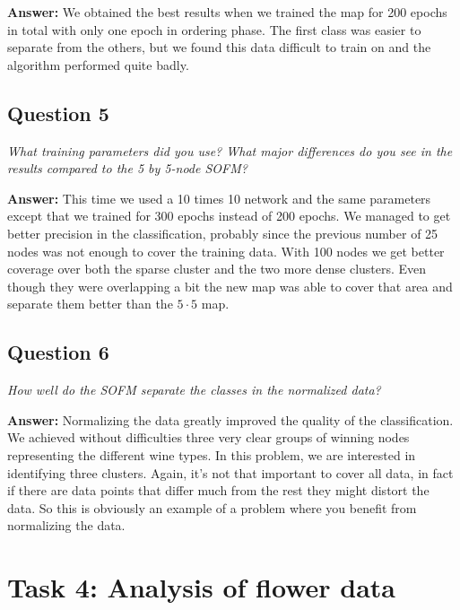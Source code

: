 \documentclass[a4paper]{article}
\begin{document}
\textbf{Answer:} We obtained the best results when we trained the map for 200 epochs in total with only one epoch in ordering phase. The first class was easier to separate from the others, but we found this data difficult to train on and the algorithm performed quite badly.

\subsection*{Question 5}
\emph{What training parameters did you use? What  major differences
do you see in the results compared to the 5 by 5-node SOFM?}

\textbf{Answer:} This time we used a 10 times 10 network and the same parameters except that we trained for 300 epochs instead of 200 epochs. We managed to get better precision in the classification, probably since the previous number of 25 nodes was not enough to cover the training data. With 100 nodes we get better coverage over both the sparse cluster and the two more dense clusters. Even though they were overlapping a bit the new map was able to cover that area and separate them better than the $5\cdot5$ map. 


\subsection*{Question 6}
\emph{How well do the SOFM separate the classes in the normalized
data?}

\textbf{Answer:} Normalizing the data greatly improved the quality of the classification. We achieved without difficulties three very clear groups of winning nodes representing the different wine types. In this problem, we are interested in identifying three clusters. Again, it's not that important to cover all data, in fact if there are data points that differ much from the rest they might distort the data. So this is obviously an example of a problem where you benefit from normalizing the data. 

\pagebreak
\section*{Task 4: Analysis of flower data}

 
\end{document}
